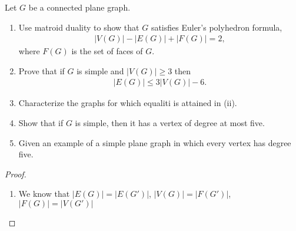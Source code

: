 \prob
{
    Let $G$ be a connected plane graph.
    \begin{enumerate}[label=(\roman*)]
        \item Use matroid duality to show that $G$ satisfies Euler's polyhedron formula,
                \begin{align}
                        |V(G)| - |E(G)| + |F(G)| = 2,
                \end{align}
                where $F(G)$ is the set of faces of $G$.
        \item Prove that if $G$ is simple and $|V(G)| \geq 3$ then
                \begin{align}
                    |E(G)| \leq 3|V(G)| - 6.
                \end{align}
                
        \item Characterize the graphs for which equaliti is attained in (ii).
        
        \item Show that if $G$ is simple, then it has a vertex of degree at most five.
        
        \item Given an example of a simple plane graph in which every vertex has degree five.
    \end{enumerate}
}
\begin{proof}
    \begin{enumerate}[label=(\roman*)]
        \item
            We know that $|E(G)| = |E(G')|$, $|V(G)| = |F(G')|$, $|F(G)| = |V(G')|$
    \end{enumerate}    
\end{proof}